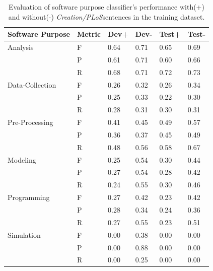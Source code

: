 \begin{table}[ht]
	\centering
	\caption{Evaluation of software purpose classifier's performance with(+) and without(-) \emph{Creation/PLoS}sentences in the training dataset.}
	\begin{tabular*}{0.75\textwidth}{@{\extracolsep{\fill}}  l  l l  l l l } %
		\hline
		Software Purpose & Metric & Dev+        & Dev-     & Test+  &Test- \\
		\hline 
		Analysis         & F     & 0.64        & 0.71     &0.65     &0.69   \\
		                 & P     & 0.61        & 0.71     &0.60     &0.66   \\
		                 & R     & 0.68        & 0.71     &0.72     &0.73   \\
		\hline
		Data-Collection  & F     & 0.26        &  0.32    & 0.26    & 0.34  \\
					     & P     & 0.25        &  0.33    & 0.22    & 0.30  \\
						 & R     & 0.28        &  0.31    & 0.30    & 0.31  \\		
		
		\hline
		Pre-Processing   & F     & 0.41        &  0.45    & 0.49    & 0.57  \\
						 & P     & 0.36        &  0.37    & 0.45    & 0.49  \\
						 & R     & 0.48        &  0.56    & 0.58    & 0.67  \\
		\hline
		Modeling         & F     & 0.25        &  0.54    & 0.30    & 0.44  \\
					     & P     & 0.27        &  0.54    & 0.28    & 0.42  \\
						 & R     & 0.24        &  0.55    & 0.30    & 0.46  \\
	
		\hline
		Programming      & F     & 0.27        &  0.42    & 0.23    & 0.42  \\
						 & P     & 0.28        &  0.34    & 0.24    & 0.36  \\
						 & R     & 0.27        &  0.55    & 0.23    & 0.51  \\
		
		\hline
		Simulation      & F     & 0.00        &  0.38    & 0.00    & 0.00 \\
						& P     & 0.00        &  0.88    & 0.00    & 0.00  \\
						& R     & 0.00        &  0.25    & 0.00    & 0.00  \\
		

\end{tabular*}
\end{table}
